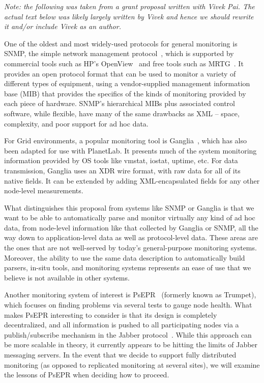 {\em Note: the following was taken from a grant proposal written with Vivek
Pai.  The actual text below was likely largely written by Vivek and hence
we should rewrite it and/or include Vivek as an author.}

One of the oldest and most widely-used protocols for general monitoring
is SNMP, the simple network management protocol~\cite{snmprfc1157},
which is supported by commercial tools such as HP's
OpenView~\cite{openview} and free tools such as MRTG~\cite{mrtg}. It
provides an open protocol format that can be used to monitor a variety
of different types of equipment, using a vendor-supplied management
information base (MIB) that provides the specifics of the kinds of
monitoring provided by each piece of hardware. SNMP's hierarchical
MIBs plus associated control software, while flexible, have many of
the same drawbacks as XML -- space, complexity, and poor support for
ad hoc data.

For Grid environments, a popular monitoring tool is
Ganglia~\cite{ganglia}, which has also been adapted for use with
PlanetLab. It presents much of the system monitoring information
provided by OS tools like vmstat, iostat, uptime, etc. For data
transmission, Ganglia uses an XDR wire format, with raw data for all
of its native fields.  It can be extended by adding XML-encapsulated
fields for any other node-level measurements. 

What distinguishes this proposal from systems like SNMP or Ganglia is
that we want to be able to automatically parse and monitor virtually
any kind of ad hoc data, from node-level information like that
collected by Ganglia or SNMP, all the way down to application-level
data as well as protocol-level data. These areas are the ones that are
not well-served by today's general-purpose monitoring
systems. Moreover, the ability to use the same data description to
automatically build parsers, in-situ tools, and monitoring systems
represents an ease of use that we believe is not available in other
systems.

Another monitoring system of interest is PsEPR~\cite{psepr} (formerly
known as Trumpet), which focuses on finding problems via several tests
to gauge node health. What makes PsEPR interesting to consider is that
its design is completely decentralized, and all information is pushed
to all participating nodes via a publish/subscribe mechanism in the
Jabber protocol~\cite{jabber}. While this approach can be more
scalable in theory, it currently appears to be hitting the limits of
Jabber messaging servers. In the event that we decide to support
fully distributed monitoring (as opposed to replicated monitoring at
several sites), we will examine the lessons of PsEPR when deciding how
to proceed.

